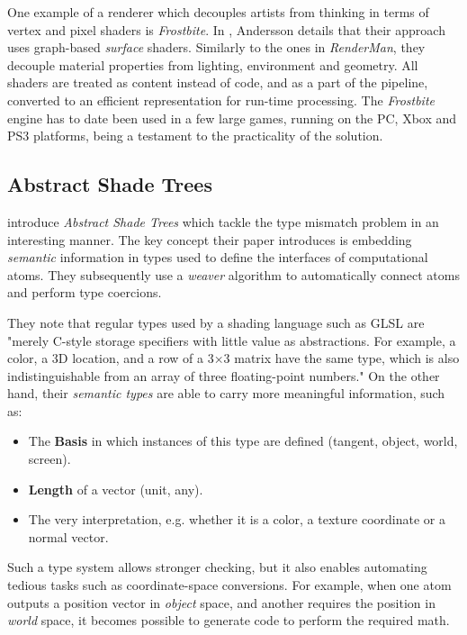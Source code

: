 One example of a renderer which decouples artists from thinking in terms of vertex and pixel shaders is \emph{Frostbite}. In \cite{AT07}, Andersson details that their approach uses graph-based \emph{surface} shaders. Similarly to the ones in \emph{RenderMan}, they decouple material properties from lighting, environment and geometry. All shaders are treated as content instead of code, and as a part of the pipeline, converted to an efficient representation for run-time processing. The \emph{Frostbite} engine has to date been used in a few large games, running on the PC, Xbox and PS3 platforms, being a testament to the practicality of the solution.

\subsection{Abstract Shade Trees}

\citet{mcguire2006shadetrees} introduce \emph{Abstract Shade Trees} which tackle the type mismatch problem \cite{AbramWhitted90} in an interesting manner. The key concept their paper introduces is embedding \emph{semantic} information in types used to define the interfaces of computational atoms. They subsequently use a \emph{weaver} algorithm to automatically connect atoms and perform type coercions.

They note that regular types used by a shading language such as GLSL are "merely C-style storage specifiers with little value as abstractions. For example, a color, a 3D location, and a row of a 3×3 matrix have the same type, which is also indistinguishable from an array of three floating-point numbers." On the other hand, their \emph{semantic types} are able to carry more meaningful information, such as:
\begin{itemize}
\item The \textbf{Basis} in which instances of this type are defined (tangent, object, world, screen).
\item \textbf{Length} of a vector (unit, any).
\item The very interpretation, e.g. whether it is a color, a texture coordinate or a normal vector.
\end{itemize}

Such a type system allows stronger checking, but it also enables automating tedious tasks such as coordinate-space conversions. For example, when one atom outputs a position vector in \emph{object} space, and another requires the position in \emph{world} space, it becomes possible to generate code to perform the required math.


